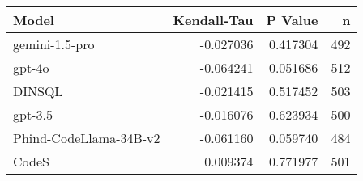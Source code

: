 \begin{tabular}{lrrr}
\toprule
Model & Kendall-Tau & P Value & n \\
\midrule
gemini-1.5-pro & -0.027036 & 0.417304 & 492 \\
gpt-4o & -0.064241 & 0.051686 & 512 \\
DINSQL & -0.021415 & 0.517452 & 503 \\
gpt-3.5 & -0.016076 & 0.623934 & 500 \\
Phind-CodeLlama-34B-v2 & -0.061160 & 0.059740 & 484 \\
CodeS & 0.009374 & 0.771977 & 501 \\
\bottomrule
\end{tabular}
